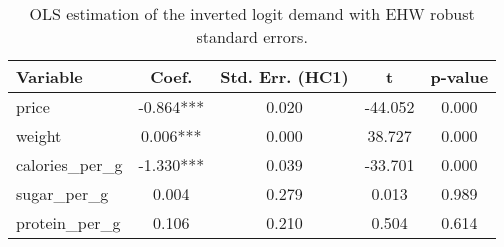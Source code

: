 \begin{table}
\caption{OLS estimation of the inverted logit demand with EHW robust standard errors.}
\label{tab:q3_ols_ehw}
\begin{tabular}{lcccc}
\toprule
Variable & Coef. & Std. Err. (HC1) & t & p-value \\
\midrule
price & -0.864*** & 0.020 & -44.052 & 0.000 \\
weight & 0.006*** & 0.000 & 38.727 & 0.000 \\
calories_per_g & -1.330*** & 0.039 & -33.701 & 0.000 \\
sugar_per_g & 0.004 & 0.279 & 0.013 & 0.989 \\
protein_per_g & 0.106 & 0.210 & 0.504 & 0.614 \\
\bottomrule
\end{tabular}
\end{table}

